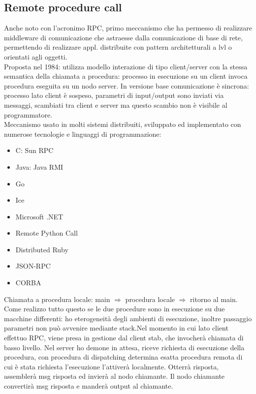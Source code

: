 \documentclass[16px]{article}
\begin{document}
\subsection{Remote procedure call}
Anche noto con l'acronimo RPC, primo meccanismo che ha permesso di realizzare middleware di comunicazione che astraesse dalla comunicazione di base di rete, permettendo di realizzare appl. distribuite con pattern architetturali a lvl o orientati agli oggetti.\\ Proposta nel 1984: utilizza modello interazione di tipo client/server con la stessa semantica della chiamata a procedura: processo in esecuzione su un client invoca procedura eseguita su un nodo server. In versione base comunicazione è sincrona: processo lato client è sospeso, parametri di input/output sono inviati via messaggi, scambiati tra client e server ma questo scambio non è visibile al programmatore.\\ Meccanismo usato in molti sistemi distribuiti, sviluppato ed implementato con numerose tecnologie e linguaggi di programmazione:
\begin{itemize}
\item C: Sun RPC
\item Java: Java RMI
\item Go
\item Ice
\item Microsoft .NET
\item Remote Python Call
\item Distributed Ruby
\item JSON-RPC
\item CORBA
\end{itemize}
Chiamata a procedura locale: main $\Longrightarrow$ procedura locale $\Longrightarrow$ ritorno al main.\\ Come realizzo tutto questo se le due procedure sono in esecuzione su due macchine differenti: ho eterogeneità degli ambienti di esecuzione, inoltre passaggio parametri non può avvenire mediante stack.Nel momento in cui lato client effettuo RPC, viene presa in gestione dal client stab, che invocherà chiamata di basso livello. Nel server ho demone in attesa, riceve richiesta di esecuzione della procedura, con procedura di dispatching determina esatta procedura remota di cui è stata richiesta l'esecuzione l'attiverà localmente. Otterrà risposta, assemblerà msg risposta ed invierà al nodo chiamante. Il nodo chiamante convertirà msg risposta e manderà output al chiamante.
\end{document}
